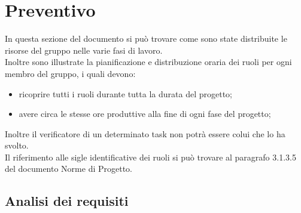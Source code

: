 \section{Preventivo}
In questa sezione del documento si può trovare come sono state distribuite le risorse del gruppo nelle varie fasi di lavoro.\\
Inoltre sono illustrate la pianificazione e distribuzione oraria dei ruoli per ogni membro del gruppo, i quali devono:
\begin{itemize}
	\item ricoprire tutti i ruoli durante tutta la durata del progetto;
	\item avere circa le stesse ore produttive alla fine di ogni fase del progetto;
\end{itemize}
Inoltre il verificatore di un determinato task non potrà essere colui che lo ha svolto.\\
Il riferimento alle sigle identificative dei ruoli si può trovare al paragrafo 3.1.3.5 del documento Norme di Progetto.

\subsection{Analisi dei requisiti}
%
